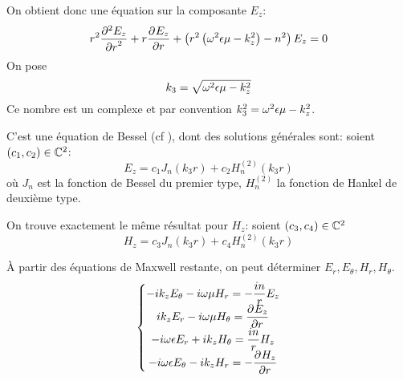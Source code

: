 On obtient donc une équation sur la composante $E_z$:
\begin{equation}
    r^2 \ddr[2]{r}{E_z} + r\ddr{r}{E_z} + \left(r^2\left(\w^2\eps\mu - k_z^2\right) - n^2\right)E_z = 0
\end{equation}
On pose 
\begin{equation}
    k_3 = \sqrt{\w^2\eps\mu - k_z^2}
\end{equation}
Ce nombre est un complexe et par convention $k_3^2 = \w^2\eps\mu - k_z^2$.

C'est une équation de Bessel (cf \cite[eq (6.80)]{bowman_introduction_1958}), dont des solutions générales sont: soient $(c_1,c_2) \in \CC^2$:
\begin{equation}
    E_z = c_1 J_n\left(k_3r\right) + c_2 H_n^{(2)}\left(k_3r\right)
\end{equation}
où $J_n$ est la fonction de Bessel du premier type, $H_n^{(2)}$ la fonction de Hankel de deuxième type. 

On trouve exactement le même résultat pour $H_z$: soient $(c_3,c_4) \in \CC^2$
\begin{equation}
    H_z = c_3 J_n\left(k_3r\right) + c_4 H_n^{(2)}\left(k_3r\right)
\end{equation}

À partir des équations de Maxwell restante, on peut déterminer $E_r,E_\theta,H_r,H_\theta$.
\begin{equation}
    \left\lbrace
    \begin{matrix}
        -ik_zE_\theta - i\w\mu H_r = -\frac{in}{r}E_z
        \\
        ik_zE_r - i\w\mu H_\theta = \ddr{r}{E_z}
        \\
        -i\w\eps E_r + ik_z H_\theta = \frac{in}{r}H_z
        \\
        -i\w\eps E_\theta - ik_z H_r = -\ddr{r}{H_z}
    \end{matrix}
    \right.
\end{equation}

